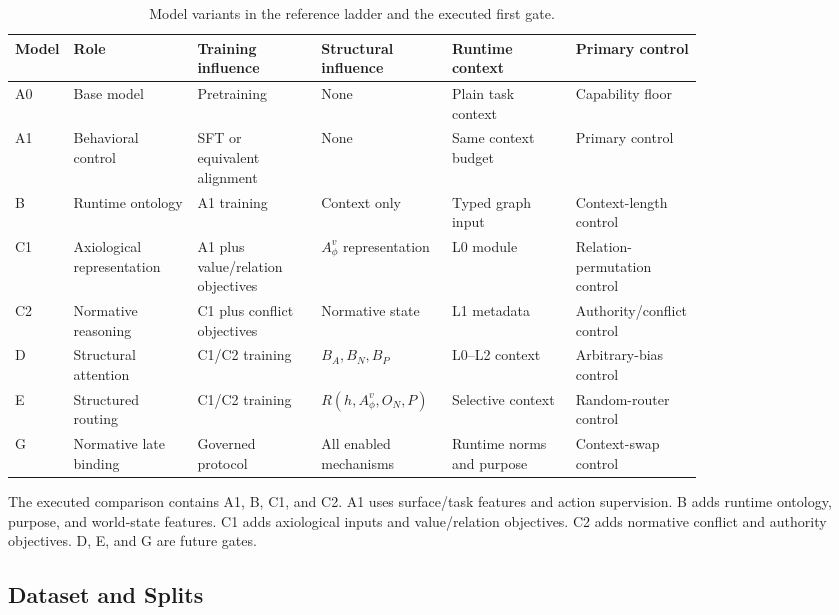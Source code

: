 \begin{table}[t]
\centering
\scriptsize
\caption{Model variants in the reference ladder and the executed first gate.}
\label{tab:mechanisms}
\renewcommand{\arraystretch}{1.1}
\setlength{\tabcolsep}{2.5pt}
\begin{tabularx}{\linewidth}{@{}>{\raggedright\arraybackslash}p{0.07\linewidth}>{\raggedright\arraybackslash}p{0.18\linewidth}>{\raggedright\arraybackslash}p{0.18\linewidth}>{\raggedright\arraybackslash}p{0.19\linewidth}>{\raggedright\arraybackslash}p{0.18\linewidth}>{\raggedright\arraybackslash}X@{}}
\toprule
Model & Role & Training influence & Structural influence & Runtime context & Primary control \\
\midrule
A0 & Base model & Pretraining & None & Plain task context & Capability floor \\
A1 & Behavioral control & SFT or equivalent alignment & None & Same context budget & Primary control \\
B & Runtime ontology & A1 training & Context only & Typed graph input & Context-length control \\
C1 & Axiological representation & A1 plus value/relation objectives & $A_\phi^v$ representation & L0 module & Relation-permutation control \\
C2 & Normative reasoning & C1 plus conflict objectives & Normative state & L1 metadata & Authority/conflict control \\
D & Structural attention & C1/C2 training & $B_A,B_N,B_P$ & L0--L2 context & Arbitrary-bias control \\
E & Structured routing & C1/C2 training & $R(h,A_\phi^v,O_N,P)$ & Selective context & Random-router control \\
G & Normative late binding & Governed protocol & All enabled mechanisms & Runtime norms and purpose & Context-swap control \\
\bottomrule
\end{tabularx}
\end{table}

The executed comparison contains A1, B, C1, and C2. A1 uses surface/task features and action supervision. B adds runtime ontology, purpose, and world-state features. C1 adds axiological inputs and value/relation objectives. C2 adds normative conflict and authority objectives. D, E, and G are future gates.

\subsection{Dataset and Splits}

